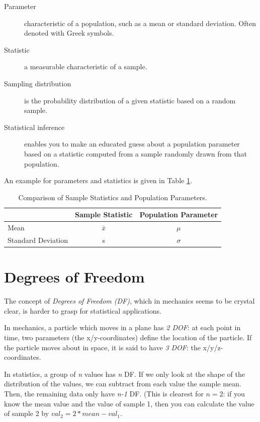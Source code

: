 \begin{description}
  \item[Parameter] characteristic of a population, such as a mean or standard deviation. Often denoted with Greek symbols.
  \item[Statistic] a measurable characteristic of a sample.
  \item[Sampling distribution] is the probability distribution of a given statistic based on a random sample.
  \item[Statistical inference] enables you to make an educated guess about a population parameter based on a statistic computed from a sample randomly drawn from that population.
\end{description}

An example for parameters and statistics is given in Table \ref{table:population}.

\begin{table}[ht]

  \centering
    \begin{tabular}{|l|c|c|}
      \hline
       & Sample Statistic & Population Parameter \\
       \hline
      Mean & $\bar{x}$ & $\mu$ \\
      Standard Deviation & s & $\sigma$ \\
      \hline
    \end{tabular}
    \caption{Comparison of Sample Statistics and Population Parameters.}
    \label{table:population}
\end{table}

\section{Degrees of Freedom}\label{sec:DF}

The concept of \emph{Degrees of Freedom (DF)}, which in mechanics seems to be crystal clear, is harder to grasp for statistical applications.

In mechanics, a particle which moves in a plane has \emph{2 DOF}: at each point in time, two parameters (the x/y-coordinates) define the location of the particle. If the particle moves about in space, it is said to have \emph{3 DOF}: the x/y/z-coordinates.

In statistics, a group of \emph{n} values has \emph{n} DF. If we only look at the shape of the distribution of the values, we can subtract from each value the sample mean. Then, the remaining data only have \emph{n-1} DF. (This is clearest for $n=2$: if you know the mean value and the value of sample 1, then you can calculate the value of sample 2 by $val_2 = 2*mean - val_1$.

